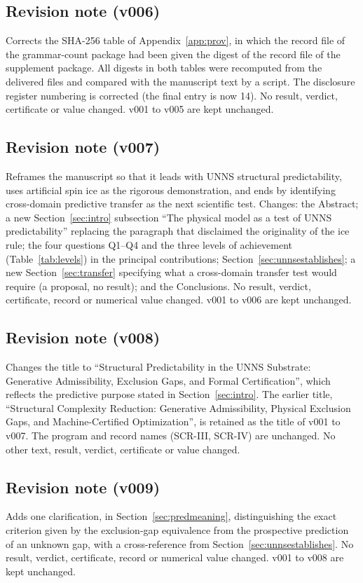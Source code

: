 \documentclass[11pt,a4paper]{article}
\theoremstyle{plain}
\theoremstyle{definition}
\theoremstyle{remark}
\begin{document}
\subsection{Revision note (v006)}
Corrects the SHA-256 table of Appendix~\ref{app:prov}, in which the record file of the grammar-count package had been given the digest of the record file of the supplement package. All digests in both tables were recomputed from the delivered files and compared with the manuscript text by a script. The disclosure register numbering is corrected (the final entry is now 14). No result, verdict, certificate or value changed. v001 to v005 are kept unchanged.

\subsection{Revision note (v007)}
Reframes the manuscript so that it leads with UNNS structural predictability, uses artificial spin ice as the rigorous demonstration, and ends by identifying cross-domain predictive transfer as the next scientific test. Changes: the Abstract; a new Section~\ref{sec:intro} subsection ``The physical model as a test of UNNS predictability'' replacing the paragraph that disclaimed the originality of the ice rule; the four questions Q1--Q4 and the three levels of achievement (Table~\ref{tab:levels}) in the principal contributions; Section~\ref{sec:unnsestablishes}; a new Section~\ref{sec:transfer} specifying what a cross-domain transfer test would require (a proposal, no result); and the Conclusions. No result, verdict, certificate, record or numerical value changed. v001 to v006 are kept unchanged.

\subsection{Revision note (v008)}
Changes the title to ``Structural Predictability in the UNNS Substrate: Generative Admissibility, Exclusion Gaps, and Formal Certification'', which reflects the predictive purpose stated in Section~\ref{sec:intro}. The earlier title, ``Structural Complexity Reduction: Generative Admissibility, Physical Exclusion Gaps, and Machine-Certified Optimization'', is retained as the title of v001 to v007. The program and record names (SCR-III, SCR-IV) are unchanged. No other text, result, verdict, certificate or value changed.

\subsection{Revision note (v009)}
Adds one clarification, in Section~\ref{sec:predmeaning}, distinguishing the exact criterion given by the exclusion-gap equivalence from the prospective prediction of an unknown gap, with a cross-reference from Section~\ref{sec:unnsestablishes}. No result, verdict, certificate, record or numerical value changed. v001 to v008 are kept unchanged.
\end{document}
